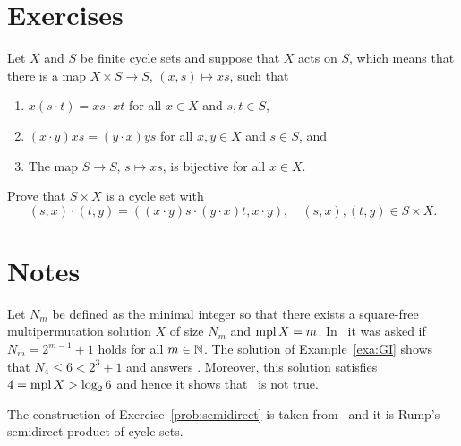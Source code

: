\section*{Exercises}

\begin{prob}
	\label{prob:semidirect}
	Let $X$ and $S$ be finite cycle sets and suppose that $X$ acts on $S$,
	which means that there is a map $X\times S\to S$, $(x,s)\mapsto xs$, such
	that 
	\begin{enumerate}
		\item $x(s\cdot t)=xs\cdot xt$ for all $x\in X$ and $s,t\in S$, 
		\item $(x\cdot y)xs=(y\cdot x)ys$ for all $x,y\in X$ and $s\in S$, and 
		\item The map $S\to S$, $s\mapsto xs$, is bijective for all $x\in X$.
	\end{enumerate}
	Prove that 
	$S\times X$ is a cycle
	set with
	\[
		(s,x)\cdot (t,y)=((x\cdot y)s\cdot (y\cdot x)t,x\cdot y),\quad
		(s,x),(t,y)\in S\times X.
	\]
\end{prob}

\section*{Notes}

Let $N_m$ be defined as the minimal integer so that there exists a
square-free multipermutation solution $X$ of size $N_m$ and $\operatorname{mpl}
X=m$. In~\cite[Open question 6.13(3)]{MR2885602} it was asked if 
$N_m=2^{m-1}+1$ holds for all $m\in\mathbb{N}$. 
The solution of Example~\ref{exa:GI} 
shows that $N_4\leq 6<2^{3}+1$ and answers \cite[Open
question 6.13(3)]{MR2885602}. 
Moreover, this solution satisfies 
$4=\operatorname{mpl} X>\log_26$ and hence it shows that~\cite[Conjecture 2.14]{MR2776789} is not true. 

The construction of Exercise~\ref{prob:semidirect} 
is taken from~\cite{MR2442072} and it is Rump's semidirect product of cycle sets. 